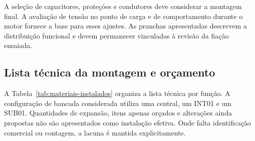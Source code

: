 A seleção de capacitores, proteções e condutores deve considerar a montagem final. A avaliação de tensão no ponto de carga e de comportamento durante o motor fornece a base para esses ajustes. As pranchas apresentadas descrevem a distribuição funcional e devem permanecer vinculadas à revisão da fiação ensaiada.

\subsection{Lista técnica da montagem e orçamento}
A Tabela~\ref{tab:materiais-instalados} organiza a lista técnica por função. A configuração de bancada considerada utiliza uma central, um INT01 e um SUB01. Quantidades de expansão, itens apenas orçados e alterações ainda propostas não são apresentados como instalação efetiva. Onde falta identificação comercial ou contagem, a lacuna é mantida explicitamente.

